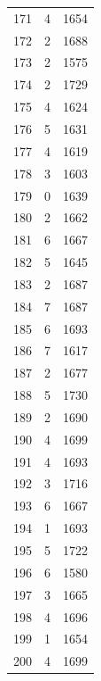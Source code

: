 \documentclass[twocolumn, 11pt]{article} %
\begin{document}
\begin{longtable}{lll}
171       & 4        & 1654     \\
172       & 2        & 1688     \\
173       & 2        & 1575     \\
174       & 2        & 1729     \\
175       & 4        & 1624     \\
176       & 5        & 1631     \\
177       & 4        & 1619     \\
178       & 3        & 1603     \\
179       & 0        & 1639     \\
180       & 2        & 1662     \\
181       & 6        & 1667     \\
182       & 5        & 1645     \\
183       & 2        & 1687     \\
184       & 7        & 1687     \\
185       & 6        & 1693     \\
186       & 7        & 1617     \\
187       & 2        & 1677     \\
188       & 5        & 1730     \\
189       & 2        & 1690     \\
190       & 4        & 1699     \\
191       & 4        & 1693     \\
192       & 3        & 1716     \\
193       & 6        & 1667     \\
194       & 1        & 1693     \\
195       & 5        & 1722     \\
196       & 6        & 1580     \\
197       & 3        & 1665     \\
198       & 4        & 1696     \\
199       & 1        & 1654     \\
200       & 4        & 1699
\end{longtable}
\end{document}
